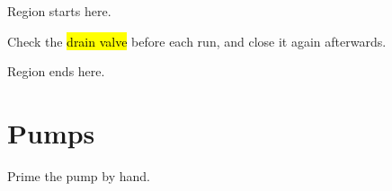 \documentclass[11pt]{article}
\begin{document}
Region starts here.

Check the \hl{drain valve} before each run, and close it again afterwards.

Region ends here.

\section{Pumps}
Prime the pump by hand.
\end{document}
